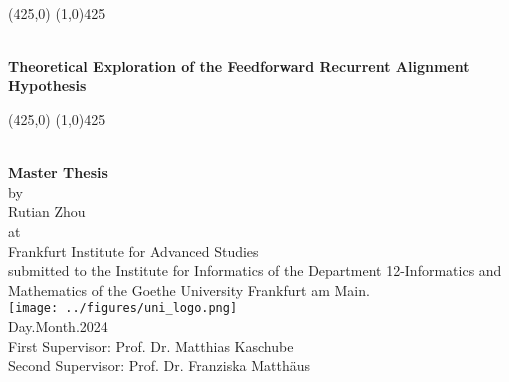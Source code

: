 \documentclass[11pt, class=article, crop=false]{standalone}
\begin{document}
		
	\begin{titlepage}
		\begin{center}
			\renewcommand{\baselinestretch}{1.5}
			\mbox{ }\\
			\begin{picture}(425,0) \linethickness{3pt} \line(1,0){425} \end{picture} \\
			\vspace{0.3cm}
			\huge
			\textbf{Theoretical Exploration of the Feedforward Recurrent Alignment Hypothesis}\\
			\vspace{0.0cm}
			\begin{picture}(425,0) \linethickness{3pt} \line(1,0){425} \end{picture} \\
			\vspace{0.6cm}
			\huge
			\textbf{Master Thesis}\\
			\vspace{0.4cm}
			\large
			by\\
			Rutian Zhou\\
			at\\
			Frankfurt Institute for Advanced Studies\\
			\vspace{0.4cm}
			\large
			submitted to the Institute for Informatics of the Department 12-Informatics and Mathematics of the Goethe University Frankfurt am Main.\\
			\vspace{0.5cm}
			\texttt{[image: ../figures/uni\_logo.png]}\\
			\vspace{0.5cm}
			Day.Month.2024 \\
			\vspace{0.3cm}
			First Supervisor: Prof. Dr. Matthias Kaschube\\
			Second Supervisor: Prof. Dr. Franziska Matthäus
		\end{center}
	\end{titlepage}
\end{document}
